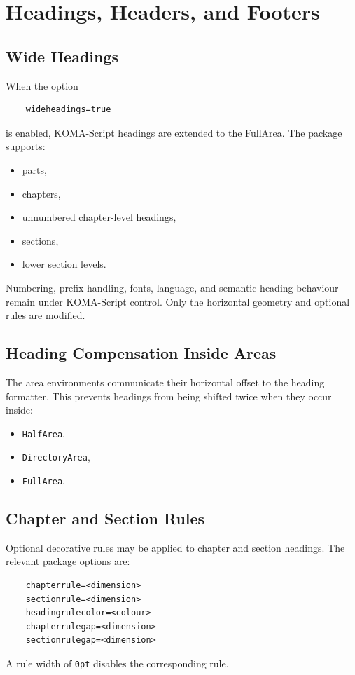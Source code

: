 \documentclass[
11pt,
a4paper,
oneside
]{scrbook}
\begin{document}
	
\chapter{Headings, Headers, and Footers}
\label{chap:headings}
	
\section{Wide Headings}
	
When the option
\begin{verbatim}
	wideheadings=true
\end{verbatim}
is enabled, KOMA-Script headings are extended to the FullArea.
The package supports:
\begin{itemize}
	\item parts,
	\item chapters,
	\item unnumbered chapter-level headings,
	\item sections,
	\item lower section levels.
\end{itemize}
Numbering, prefix handling, fonts, language, and semantic heading behaviour
remain under KOMA-Script control.
Only the horizontal geometry and optional rules are modified.
	
\section{Heading Compensation Inside Areas}
	
The area environments communicate their horizontal offset to the heading
formatter.
This prevents headings from being shifted twice when they occur inside:
\begin{itemize}
	\item \texttt{HalfArea},
	\item \texttt{DirectoryArea},
	\item \texttt{FullArea}.
\end{itemize}

\section{Chapter and Section Rules}

Optional decorative rules may be applied to chapter and section headings.
The relevant package options are:
\begin{verbatim}
	chapterrule=<dimension>
	sectionrule=<dimension>
	headingrulecolor=<colour>
	chapterrulegap=<dimension>
	sectionrulegap=<dimension>
\end{verbatim}
A rule width of \texttt{0pt} disables the corresponding rule.
\end{document}
